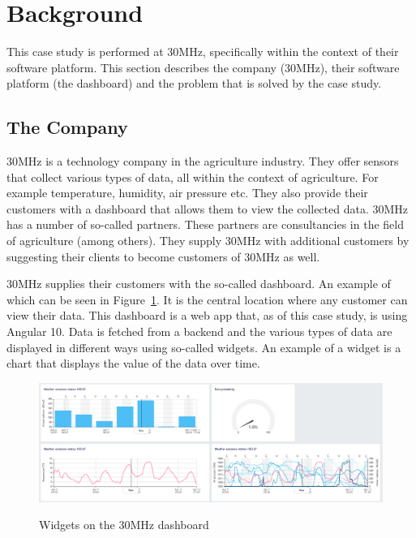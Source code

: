 \section{Background}\label{sec:background}

This case study is performed at 30MHz, specifically within the context of their software platform. This section describes the company (30MHz), their software platform (the dashboard) and the problem that is solved by the case study.

\subsection{The Company}\label{sec:bg-thecompany}
30MHz is a technology company in the agriculture industry. They offer sensors that collect various types of data, all within the context of agriculture. For example temperature, humidity, air pressure etc. They also provide their customers with a dashboard that allows them to view the collected data. 30MHz has a number of so-called partners. These partners are consultancies in the field of agriculture (among others). They supply 30MHz with additional customers by suggesting their clients to become customers of 30MHz as well.

30MHz supplies their customers with the so-called dashboard. An example of which can be seen in Figure~\ref{fig:bg-dashboard}. It is the central location where any customer can view their data. This dashboard is a web app that, as of this case study, is using Angular 10. Data is fetched from a backend and the various types of data are displayed in different ways using so-called widgets. An example of a widget is a chart that displays the value of the data over time.

\begin{figure}[h]
	\caption{Widgets on the 30MHz dashboard}
	\includegraphics[width=\columnwidth]{figures/background/dashboard.png}
	\label{fig:bg-dashboard}
	\centering
\end{figure}

